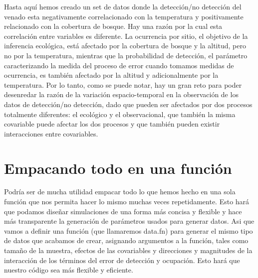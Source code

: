 \documentclass[
]{book}
\begin{document}
Hasta aquí hemos creado un set de datos donde la detección/no detección del venado esta negativamente correlacionado con la temperatura y positivamente relacionado con la cobertura de bosque. Hay una razón por la cual esta correlación entre variables es diferente. La ocurrencia por sitio, el objetivo de la inferencia ecológica, está afectado por la cobertura de bosque y la altitud, pero no por la temperatura, mientras que la probabilidad de detección, el parámetro caracterizando la medida del proceso de error cuando tomamos medidas de ocurrencia, es también afectado por la altitud y adicionalmente por la temperatura. Por lo tanto, como se puede notar, hay un gran reto para poder desenredar la razón de la variación espacio-temporal en la observación de los datos de detección/no detección, dado que pueden ser afectados por dos procesos totalmente diferentes: el ecológico y el observacional, que también la misma covariable puede afectar los dos procesos y que también pueden existir interacciones entre covariables.

\hypertarget{function1}{%
\chapter{Empacando todo en una función}\label{function1}}

Podría ser de mucha utilidad empacar todo lo que hemos hecho en una sola función que nos permita hacer lo mismo muchas veces repetidamente. Esto hará que podamos diseñar simulaciones de una forma más concisa y flexible y hace más transparente la generación de parámetros usados para generar datos. Asi que vamos a definir una función (que llamaremos data.fn) para generar el mismo tipo de datos que acabamos de crear, asignando argumentos a la función, tales como tamaño de la muestra, efectos de las covariables y direcciones y magnitudes de la interacción de los términos del error de detección y ocupación. Esto hará que nuestro código sea más flexible y eficiente.
\end{document}
